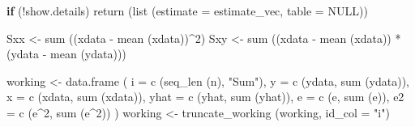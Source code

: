 \documentclass[
  letterpaper,
  DIV=11,
  numbers=noendperiod]{scrreprt}
\newenvironment{Shaded}{\begin{snugshade}}{\end{snugshade}}
\newcommand{\AttributeTok}[1]{\textcolor[rgb]{0.40,0.45,0.13}{#1}}
\newcommand{\ConstantTok}[1]{\textcolor[rgb]{0.56,0.35,0.01}{#1}}
\newcommand{\ControlFlowTok}[1]{\textcolor[rgb]{0.00,0.23,0.31}{\textbf{#1}}}
\newcommand{\DecValTok}[1]{\textcolor[rgb]{0.68,0.00,0.00}{#1}}
\newcommand{\FunctionTok}[1]{\textcolor[rgb]{0.28,0.35,0.67}{#1}}
\newcommand{\NormalTok}[1]{\textcolor[rgb]{0.00,0.23,0.31}{#1}}
\newcommand{\OtherTok}[1]{\textcolor[rgb]{0.00,0.23,0.31}{#1}}
\newcommand{\SpecialCharTok}[1]{\textcolor[rgb]{0.37,0.37,0.37}{#1}}
\newcommand{\StringTok}[1]{\textcolor[rgb]{0.13,0.47,0.30}{#1}}
\renewcommand{\[}{\begin{equation}}
\renewcommand{\]}{\end{equation}}
\begin{document}
\begin{Shaded}
\begin{Highlighting}[]
  \ControlFlowTok{if}\NormalTok{ (}\SpecialCharTok{!}\NormalTok{show.details)}
      \FunctionTok{return}\NormalTok{ (}\FunctionTok{list}\NormalTok{ (}\AttributeTok{estimate =}\NormalTok{ estimate\_vec, }\AttributeTok{table =} \ConstantTok{NULL}\NormalTok{))}

\NormalTok{  Sxx }\OtherTok{\textless{}{-}} \FunctionTok{sum}\NormalTok{ ((xdata }\SpecialCharTok{{-}} \FunctionTok{mean}\NormalTok{ (xdata))}\SpecialCharTok{\^{}}\DecValTok{2}\NormalTok{)}
\NormalTok{  Sxy }\OtherTok{\textless{}{-}} \FunctionTok{sum}\NormalTok{ ((xdata }\SpecialCharTok{{-}} \FunctionTok{mean}\NormalTok{ (xdata)) }\SpecialCharTok{*}\NormalTok{ (ydata }\SpecialCharTok{{-}} \FunctionTok{mean}\NormalTok{ (ydata)))}

\NormalTok{  working }\OtherTok{\textless{}{-}} \FunctionTok{data.frame}\NormalTok{ (}
      \AttributeTok{i    =} \FunctionTok{c}\NormalTok{ (}\FunctionTok{seq\_len}\NormalTok{ (n), }\StringTok{"Sum"}\NormalTok{),}
      \AttributeTok{y    =} \FunctionTok{c}\NormalTok{ (ydata, }\FunctionTok{sum}\NormalTok{ (ydata)),}
      \AttributeTok{x    =} \FunctionTok{c}\NormalTok{ (xdata, }\FunctionTok{sum}\NormalTok{ (xdata)),}
      \AttributeTok{yhat =} \FunctionTok{c}\NormalTok{ (yhat, }\FunctionTok{sum}\NormalTok{ (yhat)),}
      \AttributeTok{e    =} \FunctionTok{c}\NormalTok{ (e, }\FunctionTok{sum}\NormalTok{ (e)),}
      \AttributeTok{e2   =} \FunctionTok{c}\NormalTok{ (e}\SpecialCharTok{\^{}}\DecValTok{2}\NormalTok{, }\FunctionTok{sum}\NormalTok{ (e}\SpecialCharTok{\^{}}\DecValTok{2}\NormalTok{))}
\NormalTok{  )}
\NormalTok{  working }\OtherTok{\textless{}{-}} \FunctionTok{truncate\_working}\NormalTok{ (working, }\AttributeTok{id\_col =} \StringTok{"i"}\NormalTok{)}


\end{Highlighting}
\end{Shaded}
\end{document}
